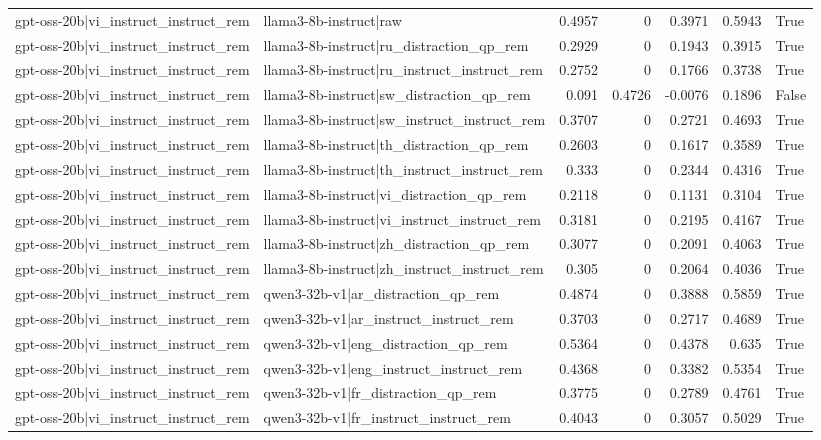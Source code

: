 \begin{table}
\begin{tabular}{l l r r r r l}
gpt-oss-20b|vi_instruct_instruct_rem & llama3-8b-instruct|raw & 0.4957 & 0 & 0.3971 & 0.5943 & True \\
gpt-oss-20b|vi_instruct_instruct_rem & llama3-8b-instruct|ru_distraction_qp_rem & 0.2929 & 0 & 0.1943 & 0.3915 & True \\
gpt-oss-20b|vi_instruct_instruct_rem & llama3-8b-instruct|ru_instruct_instruct_rem & 0.2752 & 0 & 0.1766 & 0.3738 & True \\
gpt-oss-20b|vi_instruct_instruct_rem & llama3-8b-instruct|sw_distraction_qp_rem & 0.091 & 0.4726 & -0.0076 & 0.1896 & False \\
gpt-oss-20b|vi_instruct_instruct_rem & llama3-8b-instruct|sw_instruct_instruct_rem & 0.3707 & 0 & 0.2721 & 0.4693 & True \\
gpt-oss-20b|vi_instruct_instruct_rem & llama3-8b-instruct|th_distraction_qp_rem & 0.2603 & 0 & 0.1617 & 0.3589 & True \\
gpt-oss-20b|vi_instruct_instruct_rem & llama3-8b-instruct|th_instruct_instruct_rem & 0.333 & 0 & 0.2344 & 0.4316 & True \\
gpt-oss-20b|vi_instruct_instruct_rem & llama3-8b-instruct|vi_distraction_qp_rem & 0.2118 & 0 & 0.1131 & 0.3104 & True \\
gpt-oss-20b|vi_instruct_instruct_rem & llama3-8b-instruct|vi_instruct_instruct_rem & 0.3181 & 0 & 0.2195 & 0.4167 & True \\
gpt-oss-20b|vi_instruct_instruct_rem & llama3-8b-instruct|zh_distraction_qp_rem & 0.3077 & 0 & 0.2091 & 0.4063 & True \\
gpt-oss-20b|vi_instruct_instruct_rem & llama3-8b-instruct|zh_instruct_instruct_rem & 0.305 & 0 & 0.2064 & 0.4036 & True \\
gpt-oss-20b|vi_instruct_instruct_rem & qwen3-32b-v1|ar_distraction_qp_rem & 0.4874 & 0 & 0.3888 & 0.5859 & True \\
gpt-oss-20b|vi_instruct_instruct_rem & qwen3-32b-v1|ar_instruct_instruct_rem & 0.3703 & 0 & 0.2717 & 0.4689 & True \\
gpt-oss-20b|vi_instruct_instruct_rem & qwen3-32b-v1|eng_distraction_qp_rem & 0.5364 & 0 & 0.4378 & 0.635 & True \\
gpt-oss-20b|vi_instruct_instruct_rem & qwen3-32b-v1|eng_instruct_instruct_rem & 0.4368 & 0 & 0.3382 & 0.5354 & True \\
gpt-oss-20b|vi_instruct_instruct_rem & qwen3-32b-v1|fr_distraction_qp_rem & 0.3775 & 0 & 0.2789 & 0.4761 & True \\
gpt-oss-20b|vi_instruct_instruct_rem & qwen3-32b-v1|fr_instruct_instruct_rem & 0.4043 & 0 & 0.3057 & 0.5029 & True \\

\end{tabular}
\end{table}
